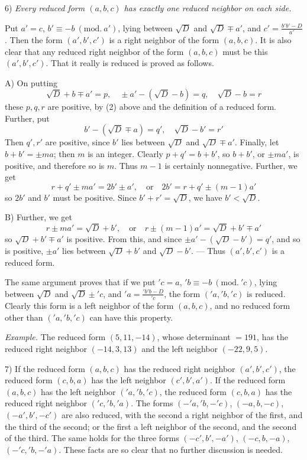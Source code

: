 6) \textit{Every reduced form $(a,b,c)$ has exactly one reduced neighbor on each side.}

Put $a'=c$, $b'\equiv-b\ (\mathrm{mod.}\ a')$, lying between $\surd D$ and $\surd D\mp a'$, and $c'=\frac{b'b'-D}{a'}$. Then the form $(a',b',c')$ is a right neighbor of the form $(a,b,c)$. It is also clear that any reduced right neighbor of the form $(a,b,c)$ must be this $(a',b',c')$. That it really is reduced is proved as follows.

A) On putting
\[
\surd D+b\mp a'=p,\quad\pm a'-(\surd D-b)=q,\quad\surd D-b=r
\]
these $p,q,r$ are positive, by (2) above and the definition of a reduced form. Further, put
\[
b'-(\surd D\mp a)=q',\quad\surd D-b'=r'
\]
Then $q',r'$ are positive, since $b'$ lies between $\surd D$ and $\surd D\mp a'$. Finally, let $b+b'=\pm ma$; then $m$ is an integer. Clearly $p+q'=b+b'$, so $b+b'$, or $\pm ma'$, is positive, and therefore so is $m$. Thus $m-1$ is certainly nonnegative. Further, we get
\[
r+q'\pm ma'=2b'\pm a',\quad\text{or}\quad2b'=r+q'\pm(m-1)a'
\]
so $2b'$ and $b'$ must be positive. Since $b'+r'=\surd D$, we have $b'<\surd D$.

B) Further, we get
\[
r\pm ma'=\surd D+b',\quad\text{or}\quad r\pm(m-1)a'=\surd D+b'\mp a'
\]
so $\surd D+b'\mp a'$ is positive. From this, and since $\pm a'-(\surd D-b')=q'$,
and so is positive, $\pm a'$ lies between $\surd D+b'$ and $\surd D-b'$. --- Thus $(a',b',c')$ is a reduced form.

The same argument proves that if we put ${}'c=a$, ${}'b\equiv-b\ (\mathrm{mod.}\ {}'c)$, lying between $\surd D$ and $\surd D\pm{}'c$, and ${}'a=\frac{{}'b{}'b-D}{{}'c}$, the form $({}'a,{}'b,{}'c)$ is reduced. Clearly this form is a left neighbor of the form $(a,b,c)$, and no reduced form other than $({}'a,{}'b,{}'c)$ can have this property.

\textit{Example.} The reduced form $(5,11,-14)$, whose determinant $=191$, has the reduced right neighbor $(-14,3,13)$ and the left neighbor $(-22,9,5)$.

7) If the reduced form $(a,b,c)$ has the reduced right neighbor $(a',b',c')$, the reduced form $(c,b,a)$ has the left neighbor $(c',b',a')$. If the reduced form $(a,b,c)$ has the left neighbor $({}'a,{}'b,{}'c)$, the reduced form $(c,b,a)$ has the reduced right neighbor $({}'c,{}'b,{}'a)$. The forms $(-{}'a,{}'b,-{}'c)$, $(-a,b,-c)$, $(-a',b',-c')$ are also reduced, with the second a right neighbor of the first, and the third of the second; or the first a left neighbor of the second, and the second of the third. The same holds for the three forms $(-c',b',-a')$, $(-c,b,-a)$, $(-{}'c,{}'b,-{}'a)$. These facts are so clear that no further discussion is needed.

